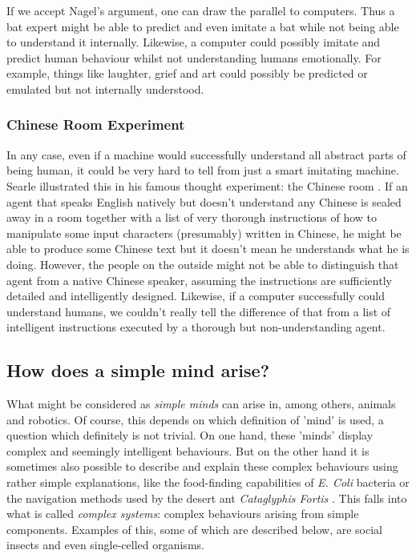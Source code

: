 \documentclass[11pt]{article}
\begin{document}

If we accept Nagel's argument, one can draw the parallel to computers. Thus a bat expert might be able to predict and even imitate a bat while not being able to understand it internally. Likewise, a computer could possibly imitate and predict human behaviour whilst not understanding humans emotionally. For example, things like laughter, grief and art could possibly be predicted or emulated but not internally understood.

\subsubsection*{Chinese Room Experiment}
\label{sec:chinese_room}

In any case, even if a machine would successfully understand all abstract parts of being human, it could be very hard to tell from just a smart imitating machine. Searle illustrated this in his famous thought experiment: the Chinese room \cite{searle1980minds}. If an agent that speaks English natively but doesn't understand any Chinese is sealed away in a room together with a list of very thorough instructions of how to manipulate some input characters (presumably) written in Chinese, he might be able to produce some Chinese text but it doesn't mean he understands what he is doing. However, the people on the outside might not be able to distinguish that agent from a native Chinese speaker, assuming the instructions are sufficiently detailed and intelligently designed. Likewise, if a computer successfully could understand humans, we couldn't really tell the difference of that from a list of intelligent instructions executed by a thorough but non-understanding agent.

\subsection{How does a simple mind arise?}

What might be considered as \textit{simple minds} can arise in, among others, animals and robotics. Of course, this depends on which definition of 'mind' is used, a question which definitely is not trivial. On one hand, these 'minds' display complex and seemingly intelligent behaviours. But on the other hand it is sometimes also possible to describe and explain these complex behaviours using rather simple explanations, like the food-finding capabilities of \textit{E. Coli} bacteria or the navigation methods used by the desert ant \textit{Cataglyphis Fortis} \cite{wahde2015autonomous}. This falls into what is called \textit{complex systems}: complex behaviours arising from simple components. Examples of this, some of which are described below, are social insects and even single-celled organisms.
\end{document}
